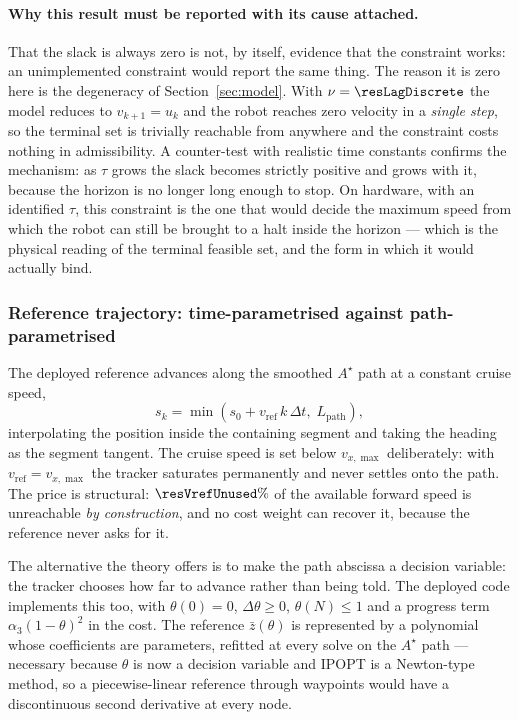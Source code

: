 \documentclass[11pt,a4paper]{article}
\newcommand{\astar}{$A^\star$}
\begin{document}
\paragraph{Why this result must be reported with its cause attached.} That the slack is always zero is not,
by itself, evidence that the constraint works: an unimplemented constraint would report the same thing. The
reason it is zero here is the degeneracy of Section~\ref{sec:model}. With $\nu=\resLagDiscrete$ the model
reduces to $v_{k+1}=u_k$ and the robot reaches zero velocity in a \emph{single step}, so the terminal set is
trivially reachable from anywhere and the constraint costs nothing in admissibility. A counter-test with
realistic time constants confirms the mechanism: as $\tau$ grows the slack becomes strictly positive and
grows with it, because the horizon is no longer long enough to stop. On hardware, with an identified $\tau$,
this constraint is the one that would decide the maximum speed from which the robot can still be brought to a
halt inside the horizon --- which is the physical reading of the terminal feasible set, and the form in which
it would actually bind.

\subsubsection{Reference trajectory: time-parametrised against path-parametrised}
\label{sec:pathfollow}

The deployed reference advances along the smoothed \astar{} path at a constant cruise speed,
\begin{equation}
  s_k=\min\!\left(s_0+v_{\mathrm{ref}}\,k\,\Delta t,\; L_{\mathrm{path}}\right),
  \label{eq:ref}
\end{equation}
interpolating the position inside the containing segment and taking the heading as the segment tangent. The
cruise speed is set below $v_{x,\max}$ deliberately: with $v_{\mathrm{ref}}=v_{x,\max}$ the tracker saturates
permanently and never settles onto the path. The price is structural: $\resVrefUnused\%$ of the available
forward speed is unreachable \emph{by construction}, and no cost weight
can recover it, because the reference never asks for it.

The alternative the theory offers is to make the path abscissa a decision variable: the tracker chooses how
far to advance rather than being told. The deployed code implements this too, with $\theta(0)=0$,
$\Delta\theta\ge0$, $\theta(N)\le1$ and a progress term $\alpha_3(1-\theta)^2$ in the cost. The reference
$\bar z(\theta)$ is represented by a polynomial whose coefficients are parameters, refitted at every solve on
the \astar{} path --- necessary because $\theta$ is now a decision variable and IPOPT is a Newton-type
method, so a piecewise-linear reference through waypoints would have a discontinuous second derivative at
every node.
\end{document}
